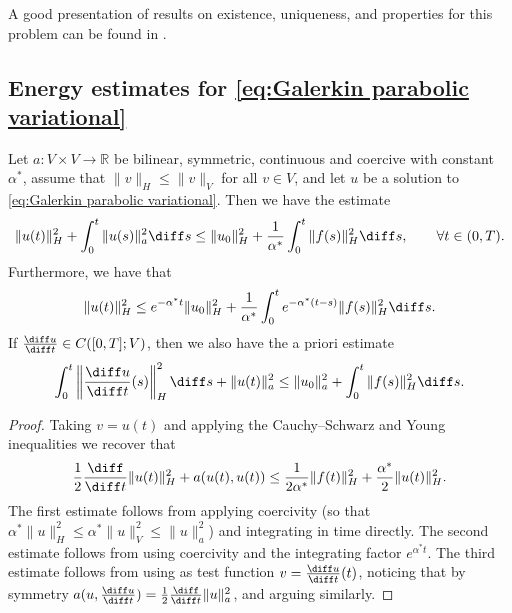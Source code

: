 A good presentation of results on existence, uniqueness, and properties for this problem can be found in \cite{Brezis2010}.

\subsection{Energy estimates for \eqref{eq:Galerkin parabolic variational}}

\begin{lemma}
    \label{lem:Galerkin parabolic a priori estimate}
    Let $a: V \times V \to \mathbb R$ be bilinear, symmetric, continuous and coercive with constant $\alpha^*$, assume that $\|v\|_H \le \|v\|_V$ for all $v \in V$, and let $u$ be a solution to \eqref{eq:Galerkin parabolic variational}. Then we have the estimate
    \begin{equation*}
        \|u(t)\|_H^2 + \int_0^t \|u(s)\|_a^2 \diff s \le \|u_0\|_H^2 +  \frac{1}{\alpha^*} \int_0^t \|f(s)\|_H^2 \diff s, \qquad \forall t \in (0,T).
    \end{equation*}
    Furthermore, we have that
    \begin{equation*}
        \|u(t)\|_H^2 \le e^{-\alpha^* t} \|u_0\|_H^2 + \frac{1}{\alpha^*} \int_0^t e^{-\alpha^*(t-s)} \|f(s)\|_H^2 \diff s.
    \end{equation*}
    If $\frac{\diff u}{\diff t} \in C([0,T]; V)$, then we also have the a priori estimate
    \begin{equation*}
        \int_0^t \left\| \frac{\diff u}{\diff t} (s)\right\|_H^2 \diff s + \|u(t)\|_a^2 \le \|u_0\|_a^2 + \int_0^t \|f(s)\|_H^2 \diff s.
    \end{equation*}
\end{lemma}
\begin{proof}
    Taking $v = u(t)$ and applying the Cauchy--Schwarz and Young inequalities we recover that
    \begin{equation*}
        \frac 1 2 \frac{\diff}{\diff t} \|u(t)\|_H^2 + a(u(t), u(t)) \le \frac 1 {2\alpha^*} \|f(t)\|_H^2 + \frac {\alpha^*} 2 \|u(t)\|_H^2.
    \end{equation*}
    The first estimate follows from applying coercivity (so that $\alpha^* \|u\|_H^2 \le \alpha^* \|u\|_V^2 \le \|u\|_a^2$) and integrating in time directly.
    The second estimate follows from using coercivity and the integrating factor $e^{\alpha^* t}$.
    The third estimate follows from using as test function $v = \frac{\diff u}{\diff t}(t)$, noticing that by symmetry $a(u, \frac{\diff u}{\diff t}) = \frac 1 2 \frac{\diff}{\diff t} \|u\|_a^2$, and arguing similarly.
\end{proof}

